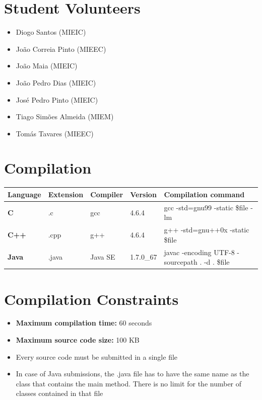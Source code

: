 \documentclass[11pt]{report}
\begin{document}
\section*{Student Volunteers}

\begin{itemize}
\item Diogo Santos (MIEIC)
\item João Correia Pinto (MIEEC)
\item João Maia (MIEIC)
\item João Pedro Dias (MIEIC)
\item José Pedro Pinto (MIEIC)
\item Tiago Simões Almeida (MIEM)
\item Tomás Tavares (MIEEC)
\end{itemize}

\section*{Compilation}

\begin{tabular}{| l | l | l | l | l |}
\hline
\textbf{Language} & \textbf{Extension} & \textbf{Compiler} & \textbf{Version} & \textbf{Compilation command} \\
\hline
\textbf{C} & .c & gcc & 4.6.4 & gcc -std=gnu99 -static \$file -lm \\
\textbf{C++} & .cpp & g++ & 4.6.4 & g++ -std=gnu++0x -static \$file \\
\textbf{Java} & .java & Java SE & 1.7.0\_67 & javac -encoding UTF-8 -sourcepath . -d . \$file \\
\hline
\end{tabular}

\section*{Compilation Constraints}

\begin{itemize}
\item \textbf{Maximum compilation time:} 60 seconds
\item \textbf{Maximum source code size:} 100 KB
\item Every source code must be submitted in a single file
\item In case of Java submissions, the .java file has to have the same name as the class that contains
  the main method. There is no limit for the number of classes contained in that file
\end{itemize}
\end{document}
